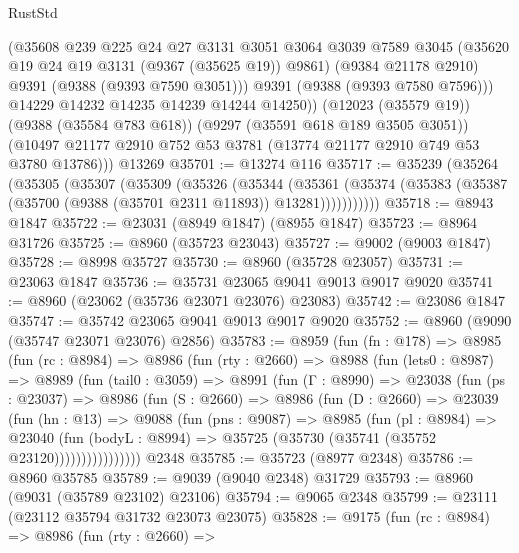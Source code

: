 \begin{lexlean}{RustStd}
\begin{coremodule}
            (@35608
              @239
              @225
              @24
              @27
              @3131
              @3051
              @3064
              @3039
              @7589
              @3045
              (@35620 @19 @24 @19 @3131 (@9367 (@35625 @19)) @9861)
              (@9384 @21178 @2910)
              @9391
              (@9388 (@9393 @7590 @3051)))
            @9391
            (@9388 (@9393 @7580 @7596)))
          @14229
          @14232
          @14235
          @14239
          @14244
          @14250))
      (@12023 (@35579 @19))
      (@9388 (@35584 @783 @618))
      (@9297 (@35591 @618 @189 @3505 @3051))
      (@10497 @21177 @2910 @752 @53 @3781 (@13774 @21177 @2910 @749 @53 @3780 @13786)))
    @13269
@35701 := @13274 @116
@35717 := @35239
    (@35264
      (@35305
        (@35307
          (@35309
            (@35326
              (@35344
                (@35361
                  (@35374 (@35383 (@35387 (@35700 (@9388 (@35701 @2311 @11893)) @13281)))))))))))
@35718 := @8943 @1847
@35722 := @23031 (@8949 @1847) (@8955 @1847)
@35723 := @8964 @31726
@35725 := @8960 (@35723 @23043)
@35727 := @9002 (@9003 @1847)
@35728 := @8998 @35727
@35730 := @8960 (@35728 @23057)
@35731 := @23063 @1847
@35736 := @35731 @23065 @9041 @9013 @9017 @9020
@35741 := @8960 (@23062 (@35736 @23071 @23076) @23083)
@35742 := @23086 @1847
@35747 := @35742 @23065 @9041 @9013 @9017 @9020
@35752 := @8960 (@9090 (@35747 @23071 @23076) @2856)
@35783 := @8959
    (fun (fn : @178) =>
    @8985
      (fun (rc : @8984) =>
      @8986
        (fun (rty : @2660) =>
        @8988
          (fun (lets0 : @8987) =>
          @8989
            (fun (tail0 : @3059) =>
            @8991
              (fun (Γ : @8990) =>
              @23038
                (fun (ps : @23037) =>
                @8986
                  (fun (S : @2660) =>
                  @8986
                    (fun (D : @2660) =>
                    @23039
                      (fun (hn : @13) =>
                      @9088
                        (fun (pns : @9087) =>
                        @8985
                          (fun (pl : @8984) =>
                          @23040
                            (fun (bodyL : @8994) =>
                            @35725 (@35730 (@35741 (@35752 @23120))))))))))))))))
    @2348
@35785 := @35723 (@8977 @2348)
@35786 := @8960 @35785
@35789 := @9039 (@9040 @2348) @31729
@35793 := @8960 (@9031 (@35789 @23102) @23106)
@35794 := @9065 @2348
@35799 := @23111 (@23112 @35794 @31732 @23073 @23075)
@35828 := @9175
    (fun (rc : @8984) =>
    @8986
      (fun (rty : @2660) =>

\end{coremodule}
\end{lexlean}
